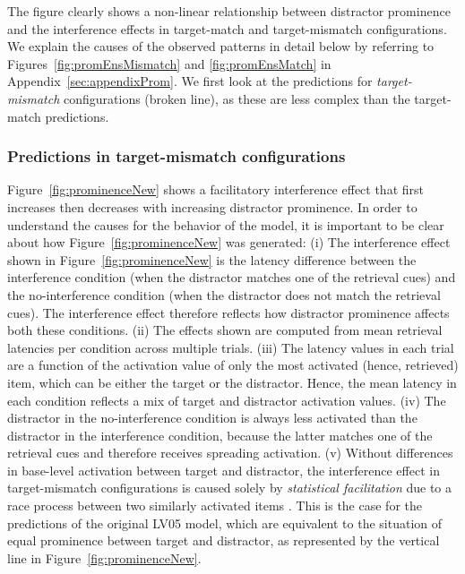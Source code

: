 \documentclass{cambridge7A}\usepackage[]{graphicx}\usepackage[]{color}
\begin{document}
The figure clearly shows a non-linear relationship between distractor prominence and the interference effects in target-match and target-mismatch configurations. We explain the causes of the observed patterns in detail below by referring to Figures~\ref{fig:promEnsMismatch} and \ref{fig:promEnsMatch} in Appendix~\ref{sec:appendixProm}. We first look at the predictions for \emph{target-mismatch} configurations (broken line), as these are less complex than the target-match predictions.

\subsubsection{Predictions in target-mismatch configurations}\label{promexpl}
Figure~\ref{fig:prominenceNew} shows a  facilitatory interference effect that first increases then decreases with increasing  distractor prominence.
In order to understand the causes for the behavior of the model, it is important to be clear about how Figure~\ref{fig:prominenceNew} was generated: 
(i) The  interference effect shown in Figure~\ref{fig:prominenceNew} is the latency difference between the interference condition (when the distractor matches one of the retrieval cues) and the no-interference condition (when the distractor does not match the retrieval cues). The interference effect therefore reflects how distractor prominence affects both these conditions.
(ii) The effects shown are computed from mean retrieval latencies per condition across multiple trials. 
(iii) The latency values in each trial are a function of the activation value of only the most activated (hence, retrieved) item, which can be either the target or the distractor. Hence, the mean latency in each condition reflects a mix of target and distractor activation values.
(iv) The distractor in the no-interference condition is always less activated than the distractor in the interference condition, because the latter matches one of the retrieval cues and therefore receives spreading activation.
(v) Without differences in base-level activation between target and distractor, the interference effect in target-mismatch configurations is caused solely by  \emph{statistical facilitation} due to a race process between two similarly activated items \citep{LogacevVasishth2015,raab1962division}.
This is the case for the predictions of the original LV05 model, which are equivalent to the situation of equal prominence between target and distractor, as represented by the vertical line in Figure~\ref{fig:prominenceNew}. 
\end{document}
